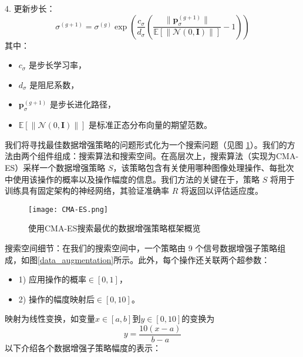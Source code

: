 \documentclass[master]{thesis-uestc}
\begin{document}
4. 更新步长：
\begin{equation}
\sigma^{(g+1)} = \sigma^{(g)} \exp\left(\frac{c_\sigma}{d_\sigma} \left(\frac{\|\mathbf{p}_\sigma^{(g+1)}\|}{\mathbb{E}[\|\mathcal{N}(0, \mathbf{I})\|]} - 1\right)\right)
\label{eq:stepsize_update}
\end{equation}
其中：
\begin{itemize}
    \item \(c_\sigma\) 是步长学习率，
    \item \(d_\sigma\) 是阻尼系数，
    \item \(\mathbf{p}_\sigma^{(g+1)}\) 是步长进化路径，
    \item \(\mathbb{E}[\|\mathcal{N}(0, \mathbf{I})\|]\) 是标准正态分布向量的期望范数。
\end{itemize}

我们将寻找最佳数据增强策略的问题形式化为一个搜索问题（见图 \ref{CMA-ES}）。我们的方法由两个组件组成：搜索算法和搜索空间。在高层次上，搜索算法（实现为CMA-ES）采样一个数据增强策略 \( S \)，该策略包含有关使用哪种图像处理操作、每批次中使用该操作的概率以及操作幅度的信息。我们方法的关键在于，策略 \( S \) 将用于训练具有固定架构的神经网络，其验证准确率 \( R \) 将返回以评估适应度。
\begin{figure}[h]
    \centering
    \texttt{[image: CMA-ES.png]}
    \caption{使用CMA-ES搜索最优的数据增强策略框架概览}
    \label{CMA-ES}
\end{figure}
搜索空间细节：在我们的搜索空间中，一个策略由 9 个信号数据增强子策略组成，如图\ref{data_augmentation}所示。此外，每个操作还关联两个超参数：
\begin{itemize}
    \item 1) 应用操作的概率\(\in [0,1]\)，
    \item 2) 操作的幅度映射后\(\in [0,10]\)。
\end{itemize}
映射为线性变换，如变量\(x \in [a,b]\)到\(y \in [0,10]\)的变换为
\begin{equation}
    y = \frac{10(x - a)}{b - a}
    \end{equation}
以下介绍各个数据增强子策略幅度的表示：
\end{document}
